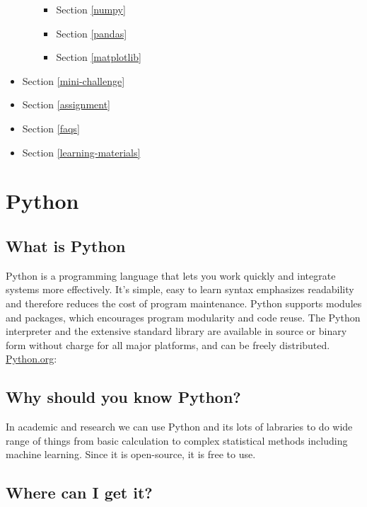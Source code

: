 \documentclass[11pt]{article}
\providecommand{\tightlist}{%
      \setlength{\itemsep}{0pt}\setlength{\parskip}{0pt}}
\begin{document}
\begin{itemize}
\begin{itemize}
    \begin{itemize}
    \tightlist
    \item
      Section \ref{numpy}
    \item
      Section \ref{pandas}
    \item
      Section \ref{matplotlib}
    \end{itemize}
  \end{itemize}
\item
  Section \ref{mini-challenge}
\item
  Section \ref{assignment}
\item
  Section \ref{faqs}
\item
  Section \ref{learning-materials}
\end{itemize}

    \section{Python}\label{python}

\subsection{What is Python}\label{what-is-python}

Python is a programming language that lets you work quickly and
integrate systems more effectively. It's simple, easy to learn syntax
emphasizes readability and therefore reduces the cost of program
maintenance. Python supports modules and packages, which encourages
program modularity and code reuse. The Python interpreter and the
extensive standard library are available in source or binary form
without charge for all major platforms, and can be freely distributed.
\href{https://www.python.org/}{Python.org}:

\subsection{Why should you know
Python?}\label{why-should-you-know-python}

In academic and research we can use Python and its lots of labraries to
do wide range of things from basic calculation to complex statistical
methods including machine learning. Since it is open-source, it is free
to use.

\subsection{Where can I get it?}\label{where-can-i-get-it}
\end{document}
